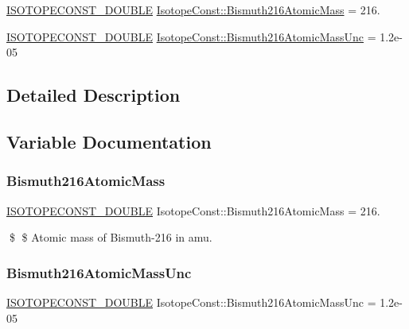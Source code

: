 \begin{DoxyCompactItemize}
\item 
\mbox{\hyperlink{group___isotope_const-_macros_ga8f45a7272ce02c0b4c65c44636ed719a}{I\+S\+O\+T\+O\+P\+E\+C\+O\+N\+S\+T\+\_\+\+D\+O\+U\+B\+LE}} \mbox{\hyperlink{group___isotope_const-_bismuth-_bi216_ga8783c6662741889e7d4ab66ae6e96431}{Isotope\+Const\+::\+Bismuth216\+Atomic\+Mass}} = 216.
\item 
\mbox{\hyperlink{group___isotope_const-_macros_ga8f45a7272ce02c0b4c65c44636ed719a}{I\+S\+O\+T\+O\+P\+E\+C\+O\+N\+S\+T\+\_\+\+D\+O\+U\+B\+LE}} \mbox{\hyperlink{group___isotope_const-_bismuth-_bi216_gaec221a3ed48433023328b6859307a11c}{Isotope\+Const\+::\+Bismuth216\+Atomic\+Mass\+Unc}} = 1.\+2e-\/05
\end{DoxyCompactItemize}


\subsection{Detailed Description}


\subsection{Variable Documentation}
\mbox{\label{group___isotope_const-_bismuth-_bi216_ga8783c6662741889e7d4ab66ae6e96431}} 
\subsubsection{\texorpdfstring{Bismuth216\+Atomic\+Mass}{Bismuth216AtomicMass}}
{\footnotesize\ttfamily \mbox{\hyperlink{group___isotope_const-_macros_ga8f45a7272ce02c0b4c65c44636ed719a}{I\+S\+O\+T\+O\+P\+E\+C\+O\+N\+S\+T\+\_\+\+D\+O\+U\+B\+LE}} Isotope\+Const\+::\+Bismuth216\+Atomic\+Mass = 216.}

\$ \$ Atomic mass of Bismuth-\/216 in amu. \mbox{\label{group___isotope_const-_bismuth-_bi216_gaec221a3ed48433023328b6859307a11c}} 
\subsubsection{\texorpdfstring{Bismuth216\+Atomic\+Mass\+Unc}{Bismuth216AtomicMassUnc}}
{\footnotesize\ttfamily \mbox{\hyperlink{group___isotope_const-_macros_ga8f45a7272ce02c0b4c65c44636ed719a}{I\+S\+O\+T\+O\+P\+E\+C\+O\+N\+S\+T\+\_\+\+D\+O\+U\+B\+LE}} Isotope\+Const\+::\+Bismuth216\+Atomic\+Mass\+Unc = 1.\+2e-\/05}

